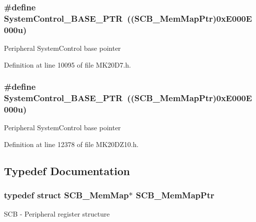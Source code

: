 \subsubsection[{\texorpdfstring{System\+Control\+\_\+\+B\+A\+S\+E\+\_\+\+P\+TR}{SystemControl_BASE_PTR}}]{\setlength{\rightskip}{0pt plus 5cm}\#define System\+Control\+\_\+\+B\+A\+S\+E\+\_\+\+P\+TR~(({\bf S\+C\+B\+\_\+\+Mem\+Map\+Ptr})0x\+E000\+E000u)}\hypertarget{group___s_c_b___peripheral_gaf22864785770f832103e904244e078cb}{}\label{group___s_c_b___peripheral_gaf22864785770f832103e904244e078cb}
Peripheral System\+Control base pointer 

Definition at line 10095 of file M\+K20\+D7.\+h.

\subsubsection[{\texorpdfstring{System\+Control\+\_\+\+B\+A\+S\+E\+\_\+\+P\+TR}{SystemControl_BASE_PTR}}]{\setlength{\rightskip}{0pt plus 5cm}\#define System\+Control\+\_\+\+B\+A\+S\+E\+\_\+\+P\+TR~(({\bf S\+C\+B\+\_\+\+Mem\+Map\+Ptr})0x\+E000\+E000u)}\hypertarget{group___s_c_b___peripheral_gaf22864785770f832103e904244e078cb}{}\label{group___s_c_b___peripheral_gaf22864785770f832103e904244e078cb}
Peripheral System\+Control base pointer 

Definition at line 12378 of file M\+K20\+D\+Z10.\+h.



\subsection{Typedef Documentation}
\subsubsection[{\texorpdfstring{S\+C\+B\+\_\+\+Mem\+Map\+Ptr}{SCB_MemMapPtr}}]{\setlength{\rightskip}{0pt plus 5cm}typedef struct {\bf S\+C\+B\+\_\+\+Mem\+Map}$\ast$ {\bf S\+C\+B\+\_\+\+Mem\+Map\+Ptr}}\hypertarget{group___s_c_b___peripheral_ga08aca299c99cac47121d9e64e7b8e1cf}{}\label{group___s_c_b___peripheral_ga08aca299c99cac47121d9e64e7b8e1cf}
S\+CB -\/ Peripheral register structure 
